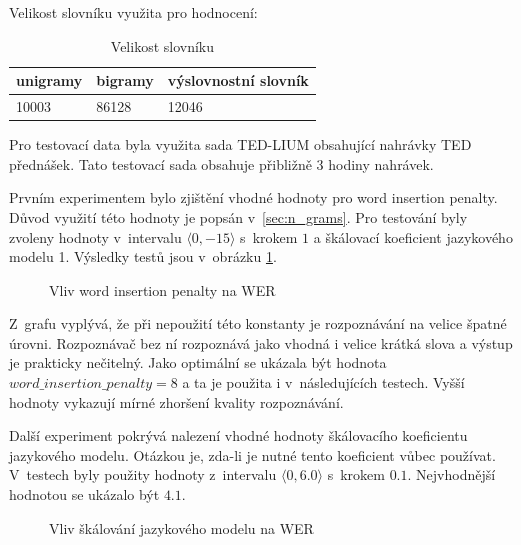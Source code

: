 Velikost slovníku využita pro hodnocení:

\begin{table}[H]
\centering
\caption{Velikost slovníku}
\label{tab:lm_info}
\begin{tabular}{|l|l|l|}
\hline
unigramy & bigramy & výslovnostní slovník \\ \hline
10003    & 86128   & 12046   \\ \hline
\end{tabular}
\end{table}

Pro testovací data byla využita sada TED-LIUM obsahující nahrávky TED přednášek. Tato testovací sada obsahuje přibližně 3 hodiny nahrávek.

\newpage
Prvním experimentem bylo zjištění vhodné hodnoty pro word insertion penalty. Důvod využití této hodnoty je popsán v~\ref{sec:n_grams}. Pro testování byly zvoleny hodnoty v~intervalu $\langle0, -15\rangle$ s~krokem $1$ a škálovací koeficient jazykového modelu 1. Výsledky testů jsou v~obrázku \ref{fig:word_insertion_penalty}.

\begin{figure}[H]\label{fig:word_insertion_penalty}
\begin{center}
\end{center}
\caption{Vliv word insertion penalty na WER}
\end{figure}

Z~grafu vyplývá, že při nepoužití této konstanty je rozpoznávání na velice špatné úrovni. Rozpoznávač bez ní rozpoznává jako vhodná i velice krátká slova a výstup je prakticky nečitelný. Jako optimální se ukázala být hodnota $word\_insertion\_penalty = 8$ a ta je použita i v~následujících testech. Vyšší hodnoty vykazují mírné zhoršení kvality rozpoznávání.


Další experiment pokrývá nalezení vhodné hodnoty škálovacího koeficientu jazykového modelu. Otázkou je, zda-li je nutné tento koeficient vůbec používat. V~testech byly použity hodnoty z~intervalu $\langle0, 6.0\rangle$ s~krokem $0.1$. Nejvhodnější hodnotou se ukázalo být $4.1$.

\begin{figure}[H]
\begin{center}
\end{center}
\caption{Vliv škálování jazykového modelu na WER}
\end{figure}

